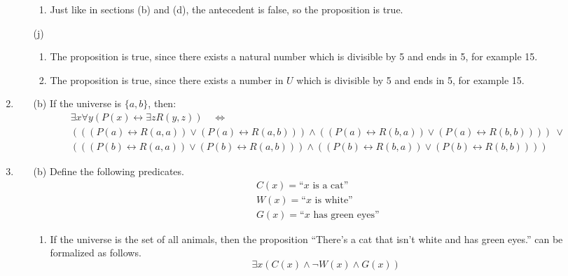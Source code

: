 \documentclass[fleqn]{article}
\begin{document}
\begin{enumerate}
\begin{enumerate}
\begin{enumerate}
			\item %
			Just like in sections (b) and (d), the antecedent is false, so the proposition is true.
		\end{enumerate}

		\item[(j)]
		\begin{enumerate}
			\item %
			The proposition is true, since there exists a natural number which is divisible by 5 and ends in 5, for example 15.
			
			\item %
			The proposition is true, since there exists a number in \(U\) which is divisible by 5 and ends in 5, for example 15.
		\end{enumerate}
	\end{enumerate}
	
	\item %
	\begin{enumerate}
		\item[(b)]
		If the universe is \(\{a, b\}\), then:
		\begin{multline*}
			\exists x \forall y (P(x) \leftrightarrow \exists z R(y, z)) 
			\quad \Leftrightarrow \quad \\
			(
				(
					(P(a) \leftrightarrow R(a, a)) 
					\lor
					(P(a) \leftrightarrow R(a, b))
				)
				\land
				(
					(P(a) \leftrightarrow R(b, a)) 
					\lor
					(P(a) \leftrightarrow R(b, b))
				)
			) 
			\ \lor \\
			(
				(
					(P(b) \leftrightarrow R(a, a)) 
					\lor
					(P(b) \leftrightarrow R(a, b))
				)
				\land
				(
					(P(b) \leftrightarrow R(b, a)) 
					\lor
					(P(b) \leftrightarrow R(b, b))
				)
			) 
		\end{multline*}
	\end{enumerate}
	
	\item %
	\begin{enumerate}
		\item[(b)]
		Define the following predicates.
		\begin{gather*}
			C(x) = \text{``\(x\) is a cat''} \\
			W(x) = \text{``\(x\) is white''} \\
			G(x) = \text{``\(x\) has green eyes''}
		\end{gather*}
		\begin{enumerate}
			\item %
			If the universe is the set of all animals, then the proposition ``There's a cat that isn't white and has green eyes.'' can be formalized as follows.
			\[\exists x (C(x) \land \lnot W(x) \land G(x))\]
			

\end{enumerate}
\end{enumerate}
\end{enumerate}
\end{document}
